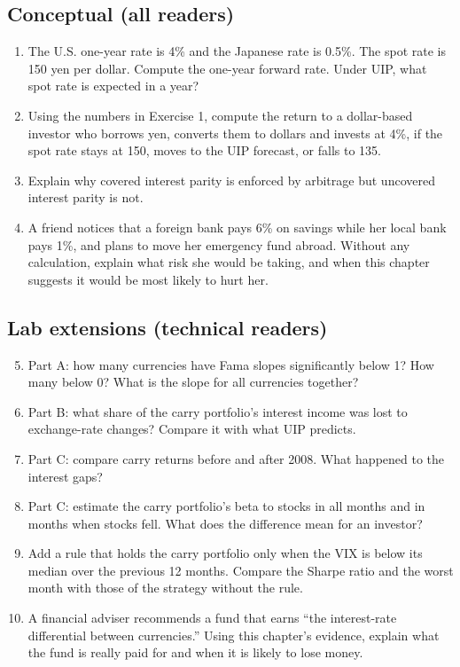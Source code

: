 \subsection*{Conceptual (all readers)}

\begin{enumerate}
  \item The U.S. one-year rate is 4\% and the Japanese rate is 0.5\%. The spot rate is 150 yen per dollar. Compute the one-year forward rate. Under UIP, what spot rate is expected in a year?
  \item Using the numbers in Exercise 1, compute the return to a dollar-based investor who borrows yen, converts them to dollars and invests at 4\%, if the spot rate stays at 150, moves to the UIP forecast, or falls to 135.
  \item Explain why covered interest parity is enforced by arbitrage but uncovered interest parity is not.
  \item A friend notices that a foreign bank pays 6\% on savings while her local bank pays 1\%, and plans to move her emergency fund abroad. Without any calculation, explain what risk she would be taking, and when this chapter suggests it would be most likely to hurt her.
\end{enumerate}

\subsection*{Lab extensions (technical readers)}

\begin{enumerate}
  \setcounter{enumi}{4}
  \item Part A: how many currencies have Fama slopes significantly below 1? How many below 0? What is the slope for all currencies together?
  \item Part B: what share of the carry portfolio's interest income was lost to exchange-rate changes? Compare it with what UIP predicts.
  \item Part C: compare carry returns before and after 2008. What happened to the interest gaps?
  \item Part C: estimate the carry portfolio's beta to stocks in all months and in months when stocks fell. What does the difference mean for an investor?
  \item Add a rule that holds the carry portfolio only when the VIX is below its median over the previous 12 months. Compare the Sharpe ratio and the worst month with those of the strategy without the rule.
  \item A financial adviser recommends a fund that earns ``the interest-rate differential between currencies.'' Using this chapter's evidence, explain what the fund is really paid for and when it is likely to lose money.
\end{enumerate}
